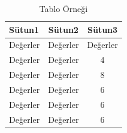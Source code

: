 \documentclass[a4paper, doc, natbib]{apa6}
\begin{document}
\begin{table}[ht]
 \begin{center}
  \begin{tabular}{|l|c|c|}
   \hline
   Sütun1 & Sütun2 & Sütun3 \\
   \hline\hline
   Değerler  &  Değerler  & Değerler \\
   \hline
   Değerler  &  Değerler & 4 \\
   \hline
   Değerler  & Değerler & 8 \\
   \hline
   Değerler  & Değerler & 6 \\
   \hline
   Değerler  & Değerler & 6 \\
   \hline
   Değerler  & Değerler & 6 \\
   \hline
  \end{tabular}
 \end{center}
 \caption{Tablo Örneği  }
 \label{table:experiments}
\end{table}
\end{document}

